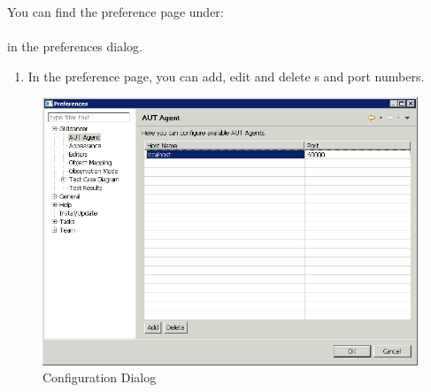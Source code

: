 
\label{serverConfigPrefPage}

You can find the \gdagent{} preference page under:\\
\\
in the preferences dialog.


\begin{enumerate}
\item In the \gdagent{} preference page, you can add, edit and delete \gdagent{}s and port numbers. 
\end{enumerate}




\begin{figure}[p]
\begin{center}
\includegraphics[width=12.5cm]{Tasks/Preferences/PS/serverconfig}
\caption{\gdagent Configuration Dialog}
\label{serverconfig}
\end{center}
\end{figure}








